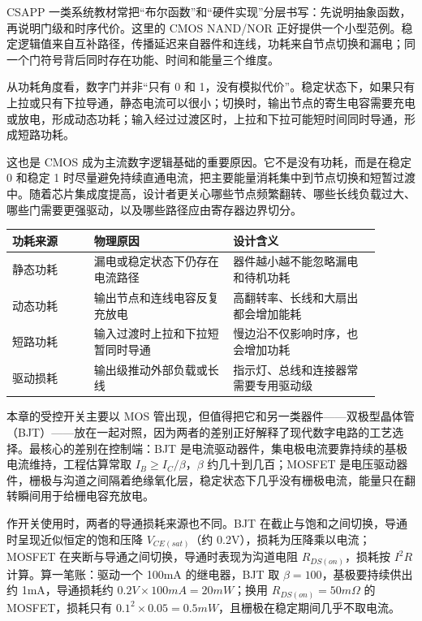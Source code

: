 \begin{classicnote}
CSAPP 一类系统教材常把“布尔函数”和“硬件实现”分层书写：先说明抽象函数，再说明门级和时序代价。这里的 CMOS NAND/NOR 正好提供一个小型范例。稳定逻辑值来自互补路径，传播延迟来自器件和连线，功耗来自节点切换和漏电；同一个门符号背后同时存在功能、时间和能量三个维度。
\end{classicnote}

从功耗角度看，数字门并非“只有 0 和 1，没有模拟代价”。稳定状态下，如果只有上拉或只有下拉导通，静态电流可以很小；切换时，输出节点的寄生电容需要充电或放电，形成动态功耗；输入经过过渡区时，上拉和下拉可能短时间同时导通，形成短路功耗。

这也是 CMOS 成为主流数字逻辑基础的重要原因。它不是没有功耗，而是在稳定 0 和稳定 1 时尽量避免持续直通电流，把主要能量消耗集中到节点切换和短暂过渡中。随着芯片集成度提高，设计者更关心哪些节点频繁翻转、哪些长线负载过大、哪些门需要更强驱动，以及哪些路径应由寄存器边界切分。

\begin{longtable}{L{0.2\linewidth}L{0.34\linewidth}L{0.36\linewidth}}
\toprule
功耗来源 & 物理原因 & 设计含义 \\
\midrule
静态功耗 & 漏电或稳定状态下仍存在电流路径 & 器件越小越不能忽略漏电和待机功耗 \\
动态功耗 & 输出节点和连线电容反复充放电 & 高翻转率、长线和大扇出都会增加能耗 \\
短路功耗 & 输入过渡时上拉和下拉短暂同时导通 & 慢边沿不仅影响时序，也会增加功耗 \\
驱动损耗 & 输出级推动外部负载或长线 & 指示灯、总线和连接器常需要专用驱动级 \\
\bottomrule
\end{longtable}

本章的受控开关主要以 MOS 管出现，但值得把它和另一类器件——双极型晶体管（BJT）——放在一起对照，因为两者的差别正好解释了现代数字电路的工艺选择。最核心的差别在控制端：BJT 是电流驱动器件，集电极电流要靠持续的基极电流维持，工程估算常取 $I_B \ge I_C/\beta$，$\beta$ 约几十到几百；MOSFET 是电压驱动器件，栅极与沟道之间隔着绝缘氧化层，稳定状态下几乎没有栅极电流，能量只在翻转瞬间用于给栅电容充放电。

作开关使用时，两者的导通损耗来源也不同。BJT 在截止与饱和之间切换，导通时呈现近似恒定的饱和压降 $V_{CE(sat)}$（约 0.2V），损耗为压降乘以电流；MOSFET 在夹断与导通之间切换，导通时表现为沟道电阻 $R_{DS(on)}$，损耗按 $I^2R$ 计算。算一笔账：驱动一个 100mA 的继电器，BJT 取 $\beta=100$，基极要持续供出约 1mA，导通损耗约 $0.2V \times 100mA = 20mW$；换用 $R_{DS(on)}=50m\Omega$ 的 MOSFET，损耗只有 $0.1^2 \times 0.05 = 0.5mW$，且栅极在稳定期间几乎不取电流。

